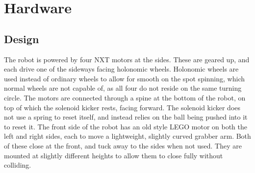 \section{Hardware}

\subsection{Design}

The robot is powered by four NXT motors at the sides. These are geared up, and
each drive one of the sideways facing holonomic wheels. Holonomic wheels are
used instead of ordinary wheels to allow for smooth on the spot spinning, which
normal wheels are not capable of, as all four do not reside on the same turning
circle. The motors are connected through a spine at the bottom of the robot,
on top of which the solenoid kicker rests, facing forward. The solenoid kicker
does not use a spring to reset itself, and instead relies on the ball being
pushed into it to reset it. The front side of the robot has an old style LEGO
motor on both the left and right sides, each to move a lightweight, slightly
curved grabber arm. Both of these close at the front, and tuck away to the
sides when not used. They are mounted at slightly different heights to allow
them to close fully without colliding.

